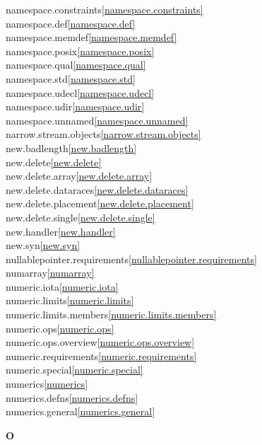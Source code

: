 \begin{multicols}{2}
namespace.constraints\quad\ref{namespace.constraints}\\
namespace.def\quad\ref{namespace.def}\\
namespace.memdef\quad\ref{namespace.memdef}\\
namespace.posix\quad\ref{namespace.posix}\\
namespace.qual\quad\ref{namespace.qual}\\
namespace.std\quad\ref{namespace.std}\\
namespace.udecl\quad\ref{namespace.udecl}\\
namespace.udir\quad\ref{namespace.udir}\\
namespace.unnamed\quad\ref{namespace.unnamed}\\
narrow.stream.objects\quad\ref{narrow.stream.objects}\\
new.badlength\quad\ref{new.badlength}\\
new.delete\quad\ref{new.delete}\\
new.delete.array\quad\ref{new.delete.array}\\
new.delete.dataraces\quad\ref{new.delete.dataraces}\\
new.delete.placement\quad\ref{new.delete.placement}\\
new.delete.single\quad\ref{new.delete.single}\\
new.handler\quad\ref{new.handler}\\
new.syn\quad\ref{new.syn}\\
nullablepointer.requirements\quad\ref{nullablepointer.requirements}\\
numarray\quad\ref{numarray}\\
numeric.iota\quad\ref{numeric.iota}\\
numeric.limits\quad\ref{numeric.limits}\\
numeric.limits.members\quad\ref{numeric.limits.members}\\
numeric.ops\quad\ref{numeric.ops}\\
numeric.ops.overview\quad\ref{numeric.ops.overview}\\
numeric.requirements\quad\ref{numeric.requirements}\\
numeric.special\quad\ref{numeric.special}\\
numerics\quad\ref{numerics}\\
numerics.defns\quad\ref{numerics.defns}\\
numerics.general\quad\ref{numerics.general}\\
\par \textbf{O}\par

\end{multicols}
